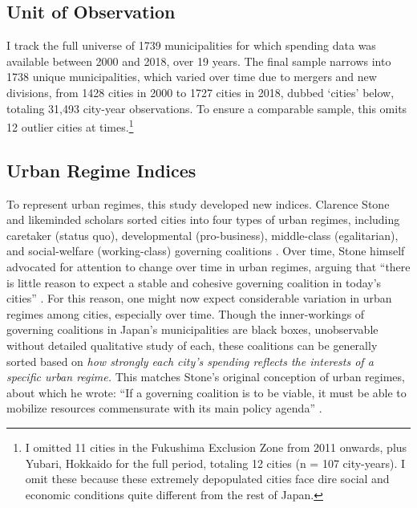 \documentclass[preprint, 3p,
authoryear]{elsarticle} %
\begin{document}
\hypertarget{unit-of-observation}{%
\subsection{Unit of Observation}\label{unit-of-observation}}

I track the full universe of 1739 municipalities for which spending data
was available between 2000 and 2018, over 19 years. The final sample
narrows into 1738 unique municipalities, which varied over time due to
mergers and new divisions, from 1428 cities in 2000 to 1727 cities in
2018, dubbed `cities' below, totaling 31,493 city-year observations. To
ensure a comparable sample, this omits 12 outlier cities at
times.\footnote{I omitted 11 cities in the Fukushima Exclusion Zone from
  2011 onwards, plus Yubari, Hokkaido for the full period, totaling 12
  cities (n = 107 city-years). I omit these because these extremely
  depopulated cities face dire social and economic conditions quite
  different from the rest of Japan.}

\hypertarget{urban-regime-indices}{%
\subsection{Urban Regime Indices}\label{urban-regime-indices}}

To represent urban regimes, this study developed new indices. Clarence
Stone and likeminded scholars sorted cities into four types of urban
regimes, including caretaker (status quo), developmental (pro-business),
middle-class (egalitarian), and social-welfare (working-class) governing
coalitions
\citep{stone_1989, stoker_and_mossberger_1994, mossberger_and_stoker_2001, kilburn_2004, de_socio_2007}.
Over time, Stone himself advocated for attention to change over time in
urban regimes, arguing that ``there is little reason to expect a stable
and cohesive governing coalition in today's cities''
\citep{stone_et_al_2015}. For this reason, one might now expect
considerable variation in urban regimes among cities, especially over
time. Though the inner-workings of governing coalitions in Japan's
municipalities are black boxes, unobservable without detailed
qualitative study of each, these coalitions can be generally sorted
based on \emph{how strongly each city's spending reflects the interests
of a specific urban regime.} This matches Stone's original conception of
urban regimes, about which he wrote: ``If a governing coalition is to be
viable, it must be able to mobilize resources commensurate with its main
policy agenda'' \citep{stone_1993}.
\end{document}
